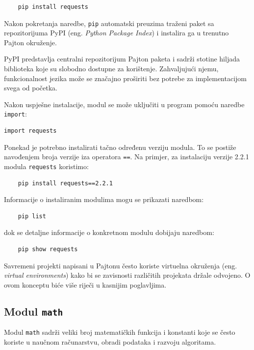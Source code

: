 \begin{verbatim}
	pip install requests
\end{verbatim}

Nakon pokretanja naredbe, \texttt{pip} automatski preuzima traženi paket sa repozitorijuma PyPI (eng. \emph{Python Package Index}) i instalira ga u trenutno Pajton okruženje.

PyPI predstavlja centralni repozitorijum Pajton paketa i sadrži stotine hiljada biblioteka koje su slobodno dostupne za korištenje. Zahvaljujući njemu, funkcionalnost jezika može se značajno proširiti bez potrebe za implementacijom svega od početka.

Nakon uspješne instalacije, modul se može uključiti u program pomoću naredbe \texttt{import}:

\begin{verbatim}
import requests
\end{verbatim}

Ponekad je potrebno instalirati tačno određenu verziju modula. To se postiže navođenjem broja verzije iza operatora \texttt{==}. Na primjer, za instalaciju verzije 2.2.1 modula \texttt{requests} koristimo:

\begin{verbatim}
	pip install requests==2.2.1
\end{verbatim}

Informacije o instaliranim modulima mogu se prikazati naredbom:
\begin{verbatim}
	pip list
\end{verbatim}

dok se detaljne informacije o konkretnom modulu dobijaju naredbom:

\begin{verbatim}
	pip show requests
\end{verbatim}

Savremeni projekti napisani u Pajtonu često koriste virtuelna okruženja (eng. \emph{virtual environments}) kako bi se zavisnosti različitih projekata držale odvojeno. O ovom konceptu biće više riječi u kasnijim poglavljima.

\subsection{Modul \texttt{math}}

Modul \texttt{math} sadrži veliki broj matematičkih funkcija i konstanti koje se često koriste u naučnom računarstvu, obradi podataka i razvoju algoritama.

